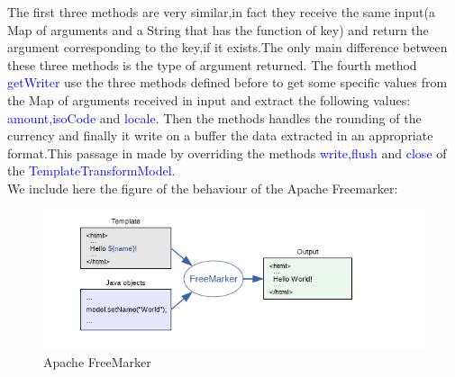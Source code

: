The first three methods are very similar,in fact they receive the same input(a Map of arguments and a String that has the function of key) and return the argument corresponding to the key,if it exists.The only main difference between these three methods is the type of argument returned.
The fourth method \textcolor{blue}{getWriter} use the three methods defined before to get some specific values from the Map of arguments received in input and extract the following values: \textcolor{blue}{amount},\textcolor{blue}{isoCode} and \textcolor{blue}{locale}. Then the methods handles the rounding of the currency and finally it write on a buffer the data extracted in an appropriate format.This passage in made by overriding the methods \textcolor{blue}{write},\textcolor{blue}{flush} and \textcolor{blue}{close} of the \textcolor{blue}{TemplateTransformModel}. \\
We include here the figure of the behaviour of the Apache Freemarker:
\begin{figure}[b]
\centering
\includegraphics{functional_role/Images/freemarker.png}
\caption{Apache FreeMarker}\label{fig:1}
\end{figure}


